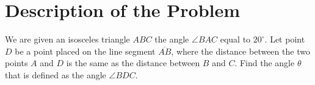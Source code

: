 \documentclass{article}
\theoremstyle{maintheorem}
\begin{document}












\section{Description of the Problem}
We are given an isosceles triangle $ABC$ the angle $\angle BAC$ equal to $20^\circ$.
Let point $D$ be a point placed on the line segment $\overline{AB}$,
where the distance between the two points $A$ and $D$ is the same as the distance between $B$ and $C$.
Find the angle $\theta$ that is defined as the angle $\angle BDC$.
\end{document}
